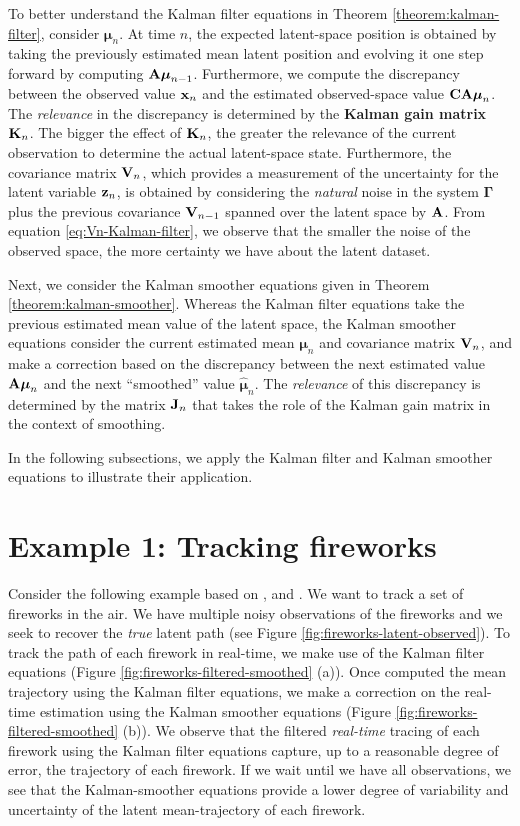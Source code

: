 \documentclass[12pt, oneside]{book}
\numberwithin{equation}{section}
\newcommand{\x}{{\bf x}}
\newcommand{\z}{{\bf z}}
\begin{document}
{To better understand the Kalman filter equations in Theorem \ref{theorem:kalman-filter}, consider $\boldsymbol{\mu}_n$. At time $n$, the expected latent-space position is obtained by taking the previously estimated mean latent position and evolving it one step forward by computing ${\bf A}\boldsymbol{\mu}_{n-1}$. Furthermore, we compute the discrepancy between the observed value $\x_n$ and the estimated observed-space value ${\bf CA}\boldsymbol{\mu}_n$. The \textit{relevance} in the discrepancy is determined by the \textbf{Kalman gain matrix} ${\bf K}_n$. The bigger the effect of ${\bf K}_n$, the greater the relevance of the current observation to determine the actual latent-space state. Furthermore, the covariance matrix ${\bf V}_n$, which provides a measurement of the uncertainty for the latent variable $\z_n$, is obtained by considering the \textit{natural} noise in the system $\boldsymbol{\Gamma}$ plus the previous covariance ${\bf V}_{n-1}$ spanned over the latent space by $\bf A$. From equation \eqref{eq:Vn-Kalman-filter}, we observe that the smaller the noise of the observed space, the more certainty we have about the latent dataset.

Next, we consider the Kalman smoother equations given in Theorem \ref{theorem:kalman-smoother}. Whereas the Kalman filter equations take the previous estimated mean value of the latent space, the Kalman smoother equations consider the current estimated mean $\boldsymbol{\mu}_n$ and covariance matrix ${\bf V}_n$, and make a correction based on the discrepancy between the next estimated value ${\bf A} \boldsymbol{\mu}_n$ and the next ``smoothed'' value $\hat{\boldsymbol{\mu}}_n$. The \textit{relevance} of this discrepancy is determined by the matrix ${\bf J}_n$ that takes the role of the Kalman gain matrix in the context of smoothing.

In the following subsections, we apply the Kalman filter and Kalman smoother equations to illustrate their application.

\section{Example 1: Tracking fireworks}
Consider the following example based on \cite{pml2Book}, and \cite{koller2009}. We want to track a set of fireworks in the air. We have multiple noisy observations of the fireworks and we seek to recover the \textit{true} latent path (see Figure \ref{fig:fireworks-latent-observed}). To track the path of each firework in real-time, we make use of the Kalman filter equations (Figure \ref{fig:fireworks-filtered-smoothed} (a)). Once computed the mean trajectory using the Kalman filter equations, we make a correction on the real-time estimation using the Kalman smoother equations (Figure \ref{fig:fireworks-filtered-smoothed} (b)). We observe that the filtered \textit{real-time} tracing of each firework using the Kalman filter equations capture, up to a reasonable degree of error, the trajectory of each firework. If we wait until we have all observations, we see that the Kalman-smoother equations provide a lower degree of variability and uncertainty of the latent mean-trajectory of each firework.

}
\end{document}
